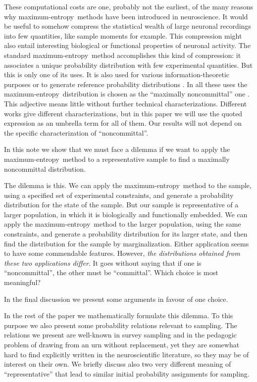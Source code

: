 \documentclass{article}
\theoremstyle{remark}
\theoremstyle{innote}
\newcommand*{\citep}{\parencites}
\renewcommand*{\cite}{\citep}
\renewcommand*{\|}{\mathpunct{|}}%
\theoremstyle{simple}
\newcommand*{\me}{maximum-entropy}
\begin{document}
These computational costs are one, probably not the earliest, of the many
reasons why \me\ methods have been introduced in neuroscience. It would be
useful to somehow compress the statistical wealth of large neuronal
recordings into few quantities, like sample moments for example. This
compression might also entail interesting biological or functional
properties of neuronal activity. The standard \me\ method
\cite{jaynes1957,sivia1996_r2006,meadetal1984} accomplishes this kind of
compression: it associates a unique probability distribution with few
experimental quantities. But this is only one of its uses. It is also used
for various information-theoretic purposes or to generate reference
probability distributions
\cite{bohteetal2000,schneidmanetal2006,shlensetal2006,roudietal2009b,mackeetal2011,tkaciketal2014b,shimazakietal2015}.
In all these uses the \me\ distribution is chosen as the \enquote{maximally
  noncommittal} one \cite{jaynes1963}. This adjective means little without
further technical characterizations. Different works give different
characterizations, but in this paper we will use the quoted expression as
an umbrella term for all of them. Our results will not depend on the
specific characterization of \enquote{noncommittal}.

\bigskip

In this note we show that we must face a dilemma if we want to apply the
\me\ method to a representative sample to find a maximally noncommittal
distribution.

The dilemma is this. We can apply the \me\ method to the sample, using a
specified set of experimental constraints, and generate a probability
distribution for the state of the sample. But our sample is representative
of a larger population, in which it is biologically and functionally
embedded. We can apply the \me\ method to the larger population, using the
same constraints, and generate a probability distribution for its larger
state, and then find the distribution for the sample by marginalization.
Either application seems to have some commendable features. However,
\emph{the distributions obtained from these two applications differ}. It
goes without saying that if one is \enquote{noncommittal}, the other must
be \enquote{committal}. Which choice is most meaningful?

In the final discussion we present some arguments in favour of one choice.

In the rest of the paper we mathematically formulate this dilemma. To this
purpose we also present some probability relations relevant to sampling.
The relations we present are well-known in survey sampling and in the
pedagogic problem of drawing from an urn without replacement, yet they are
somewhat hard to find explicitly written in the neuroscientific literature,
so they may be of interest on their own. We briefly discuss also two very
different meaning of \enquote{representative} that lead to similar initial
probability assignments for sampling.
\end{document}

